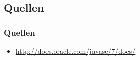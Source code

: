 \documentclass[xcolor=dvipsnames]{beamer}
\begin{document}
\subsection{Quellen}
\begin{frame} %
  \frametitle{Quellen} %
 	\begin{itemize}
			\item \url{http://docs.oracle.com/javase/7/docs/}	
	\end{itemize}
\end{frame}
\end{document}

